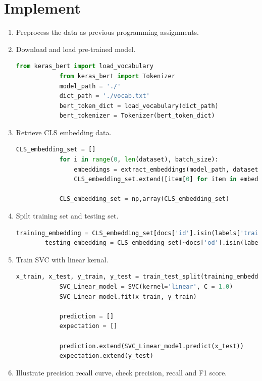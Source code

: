 \documentclass[a4paper]{article}
\theoremstyle{plain}
\begin{document}
\section{Implement}%
\label{sec:Implement}
\begin{enumerate}
    \item Preprocess the data as previous programming assignments.
    \item Download and load pre-trained model.
        \begin{lstlisting}[language=python]
            from keras_bert import load_vocabulary
            from keras_bert import Tokenizer
            model_path = './'
            dict_path = './vocab.txt'
            bert_token_dict = load_vocabulary(dict_path)
            bert_tokenizer = Tokenizer(bert_token_dict)
        \end{lstlisting}

    \item Retrieve CLS embedding data.
        \begin{lstlisting}[language=python]
            CLS_embedding_set = []
            for i in range(0, len(dataset), batch_size):
                embeddings = extract_embeddings(model_path, dataset[i:i + batch_size])
                CLS_embedding_set.extend([item[0] for item in embeddings])

            CLS_embedding_set = np,array(CLS_embedding_set)
        \end{lstlisting}
    \item Spilt training set and testing set.
        \begin{lstlisting}[language=python]
        training_embedding = CLS_embedding_set[docs['id'].isin(labels['training_id'])]
        testing_embedding = CLS_embedding_set[~docs['od'].isin(labels['training_id'])]
        \end{lstlisting}
    \item Train SVC with linear kernal.
        \begin{lstlisting}[language=python]
            x_train, x_test, y_train, y_test = train_test_split(training_embedding, labels['classes'], test_size = 0.1)
            SVC_Linear_model = SVC(kernel='linear', C = 1.0)
            SVC_Linear_model.fit(x_train, y_train)

            prediction = []
            expectation = []

            prediction.extend(SVC_Linear_model.predict(x_test))
            expectation.extend(y_test)
        \end{lstlisting}
    \item Illustrate precision recall curve, check precision, recall and F1 score.
\end{enumerate}

\end{document}
